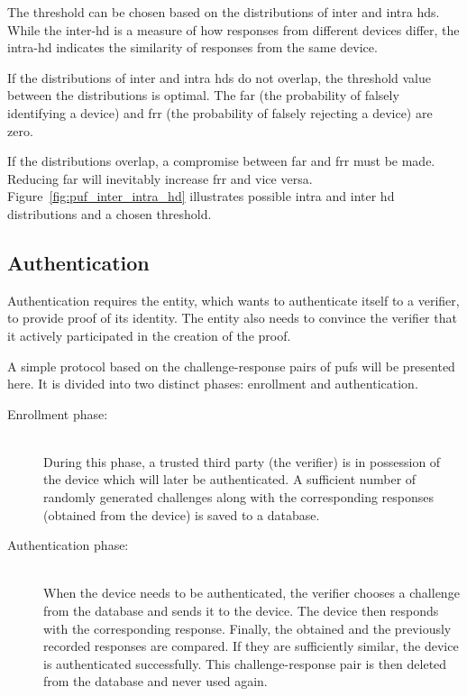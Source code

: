 The threshold can be chosen based on the distributions of inter and intra \glspl{hd}. While the inter-\gls{hd} is a measure of how responses from different devices differ, the intra-\gls{hd} indicates the similarity of responses from the same device.

If the distributions of inter and intra \glspl{hd} do not overlap, the threshold value between the distributions is optimal. The \gls{far} (the probability of falsely identifying a device) and \gls{frr} (the probability of falsely rejecting a device) are zero.

If the distributions overlap, a compromise between \gls{far} and \gls{frr} must be made. Reducing \gls{far} will inevitably increase \gls{frr} and vice versa. Figure~\ref{fig:puf_inter_intra_hd} illustrates possible intra and inter \gls{hd} distributions and a chosen threshold.

\subsection{Authentication}

Authentication requires the entity, which wants to authenticate itself to a verifier, to provide proof of its identity. The entity also needs to convince the verifier that it actively participated in the creation of the proof.~\cite{Maes2012}

A simple protocol based on the challenge-response pairs of \glspl{puf} will be presented here. It is divided into two distinct phases: enrollment and authentication.~\cite{Devadas2008}

\begin{description}
    \item[Enrollment phase:] \hfill \\ During this phase, a trusted third party (the verifier) is in possession of the device which will later be authenticated. A sufficient number of randomly generated challenges along with the corresponding responses (obtained from the device) is saved to a database.
    \item[Authentication phase:] \hfill \\ When the device needs to be authenticated, the verifier chooses a challenge from the database and sends it to the device. The device then responds with the corresponding response. Finally, the obtained and the previously recorded responses are compared. If they are sufficiently similar, the device is authenticated successfully. This challenge-response pair is then deleted from the database and never used again.
\end{description}

